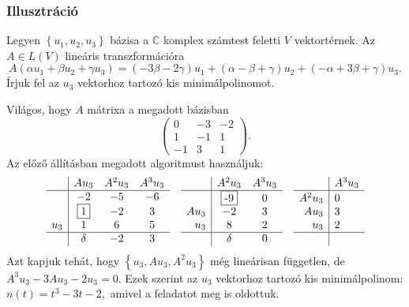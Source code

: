 \documentclass[a4paper, showtrims]{memoir}
\theoremstyle{plain}
\theoremstyle{remark}
\theoremstyle{definition}
\begin{document}
\subsubsection{Illusztráció}\label{se:kisminimalillusztracio}
Legyen $\left\{ u_1,u_2,u_3 \right\}$ bázisa a $\mathbb{C}$ komplex számtest feletti $V$ vektortérnek.
Az $A\in L\left( V \right)$ lineáris transzformációra
\[
    A\left( \alpha u_1+\beta u_2 +\gamma u_3 \right)
    =
    \left( -3\beta -2\gamma \right)u_1 +
    \left( \alpha-\beta+\gamma \right)u_2+
    \left( -\alpha+3\beta+\gamma \right)u_3.
\]
Írjuk fel az $u_3$ vektorhoz tartozó kis minimálpolinomot.

Világos, hogy $A$ mátrixa a megadott bázisban
\[
    \begin{pmatrix}
        0&-3&-2\\
        1&-1&1\\
        -1&3&1
    \end{pmatrix}.
\]
Az előző állításban megadott algoritmust használjuk:
\[
\begin{array}{r|ccc}
	     & Au_3        & A^2u_3 & A^3u_3\\
	\hline
	     & -2          &     -5 &     -6\\
         &\framebox{1} &     -2 &      3\\
	u_3  &  1          &      6 &      5\\
	\hline
	     &\delta       &     -2 &      3
\end{array}
\quad
\begin{array}{r|cc}
	     &  A^2u_3      & A^3u_3\\
	\hline
        &\framebox{-9} &     0 \\
	Au_3 &      -2      &     3 \\
	u_3  &       8      &     2 \\
	\hline
	     &\delta        &     0
\end{array}
\quad
\begin{array}{r|l}
	     &A^3u_3\\
	\hline
   A^2u_3&    0 \phantom{\framebox{0}}\\
	Au_3 &    3 \\
	u_3  &    2 \\
	\hline
         &\phantom{\delta}
\end{array}
\]
Azt kapjuk tehát, hogy
\(
	\left\{ u_3,Au_3,A^2u_3\right\}
    \)
még lineárisan független, de
\(
A^3u_3-3Au_3-2u_3=0.
\)
Ezek szerint az $u_3$ vektorhoz tartozó kis minimálpolinom:
\(
n\left( t \right)=t^3-3t-2,
\)
amivel a feladatot meg is oldottuk.
\end{document}

